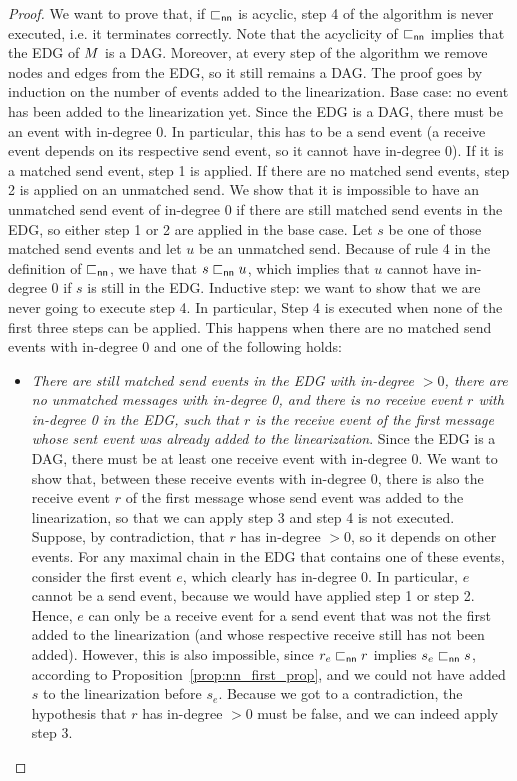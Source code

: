 \nnalgotermination*
\begin{proof}
We want to prove that, if $\sqsubset_{\mathsf{nn}}$ is acyclic, step 4 of the algorithm is never executed, i.e. it terminates correctly. Note that the acyclicity of $\sqsubset_{\mathsf{nn}}$ implies that the EDG of $M$ is a DAG. Moreover, at every step of the algorithm we remove nodes and edges from the EDG, so it still remains a DAG. The proof goes by induction on the number of events added to the linearization.\newline
Base case: no event has been added to the linearization yet. Since the EDG is a DAG, there must be an event with in-degree 0. In particular, this has to be a send event (a receive event depends on its respective send event, so it cannot have in-degree 0). If it is a matched send event, step 1 is applied. If there are no matched send events, step 2 is applied on an unmatched send. We show that it is impossible to have an unmatched send event of in-degree 0 if there are still matched send events in the EDG, so either step 1 or 2 are applied in the base case. Let $s$ be one of those matched send events and let $u$ be an unmatched send. Because of rule 4 in the definition of $\sqsubset_{\mathsf{nn}}$, we have that $s \sqsubset_{\mathsf{nn}} u$, which implies that $u$ cannot have in-degree 0 if $s$ is still in the EDG.\newline
Inductive step: we want to show that we are never going to execute step 4. In particular, Step 4 is executed when none of the first three steps can be applied. This happens when there are no matched send events with in-degree 0 and one of the following holds:
\begin{itemize}%
	\item \emph{There are still matched send events in the EDG with in-degree $>0$, there are no unmatched messages with in-degree 0, and there is no receive event $r$ with in-degree 0 in the EDG, such that $r$ is the receive event of the first message whose sent event was already added to the linearization}. Since the EDG is a DAG, there must be at least one receive event with in-degree 0. We want to show that, between these receive events with in-degree 0, there is also the receive event $r$ of the first message whose send event was added to the linearization, so that we can apply step 3 and step 4 is not executed. Suppose, by contradiction, that $r$ has in-degree $>0$, so it depends on other events. For any maximal chain in the EDG that contains one of these events, consider the first event $e$, which clearly has in-degree 0. In particular, $e$ cannot be a send event, because we would have applied step 1 or step 2. Hence, $e$ can only be a receive event for a send event that was not the first added to the linearization (and whose respective receive still has not been added). However, this is also impossible, since $r_e \sqsubset_{\mathsf{nn}} r$ implies $s_e \sqsubset_{\mathsf{nn}} s$, according to Proposition~\ref{prop:nn_first_prop}, and we could not have added $s$ to the linearization before $s_e$. Because we got to a contradiction, the hypothesis that $r$ has in-degree $>0$ must be false, and we can indeed apply step 3.

\end{itemize}
\end{proof}
